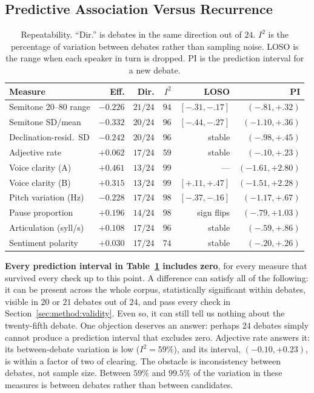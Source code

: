 \documentclass[pdflatex,sn-mathphys-num]{sn-jnl}%
\begin{document}
\subsection{Predictive Association Versus Recurrence}
\label{sec:method:recurrence}

\begin{table}[t]
\caption{Repeatability. ``Dir.'' is debates in the same direction out of $24$.
$I^2$ is the percentage of variation between debates rather than sampling
noise. LOSO is the range when each speaker in turn is dropped. PI is the
prediction interval for a new debate.}
\label{tab:grid}
\centering
\scriptsize
\setlength{\tabcolsep}{2pt}
\begin{tabular}{lrrrrr}
\toprule
Measure & Eff. & Dir. & $I^2$ & LOSO & PI \\
\midrule
Semitone 20--80 range & $-0.226$ & $21/24$ & $94$ & $[-.31,-.17]$ & $(-.81,+.32)$ \\
Semitone SD/mean      & $-0.332$ & $20/24$ & $96$ & $[-.44,-.27]$ & $(-1.10,+.36)$ \\
Declination-resid.\ SD & $-0.242$ & $20/24$ & $96$ & stable       & $(-.98,+.45)$ \\
Adjective rate        & $+0.062$ & $17/24$ & $59$ & stable        & $(-.10,+.23)$ \\
Voice clarity (A)     & $+0.461$ & $13/24$ & $99$ & ---           & $(-1.61,+2.80)$ \\
Voice clarity (B)     & $+0.315$ & $13/24$ & $99$ & $[+.11,+.47]$ & $(-1.51,+2.28)$ \\
Pitch variation (Hz)  & $-0.228$ & $17/24$ & $98$ & $[-.37,-.16]$ & $(-1.17,+.67)$ \\
Pause proportion      & $+0.196$ & $14/24$ & $98$ & sign flips    & $(-.79,+1.03)$ \\
Articulation (syll/s) & $+0.108$ & $17/24$ & $96$ & stable        & $(-.59,+.86)$ \\
Sentiment polarity    & $+0.030$ & $17/24$ & $74$ & stable        & $(-.20,+.26)$ \\
\bottomrule
\end{tabular}
\end{table}

\textbf{Every prediction interval in Table~\ref{tab:grid} includes zero},
for every measure that survived every check up to this point. A difference
can satisfy all of the following: it can be present across the whole
corpus, statistically significant within debates, visible in $20$ or $21$
debates out of $24$, and pass every check in Section~\ref{sec:method:validity}.
Even so, it can still tell us nothing about the twenty-fifth debate. One
objection deserves an answer: perhaps $24$ debates simply cannot produce a
prediction interval that excludes zero. Adjective rate answers it: its
between-debate variation is low ($I^2 = 59\%$), and its interval,
$(-0.10, +0.23)$, is within a factor of two of clearing. The
obstacle is inconsistency between debates, not sample size. Between $59\%$
and $99.5\%$ of the variation in these measures is between debates rather
than between candidates.
\end{document}
